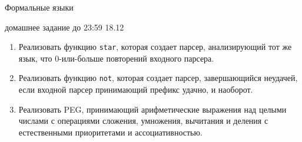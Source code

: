 \documentclass[12pt]{article}
\begin{document}
\begin{center} {\LARGE Формальные языки} \end{center}

\begin{center} \Large домашнее задание до 23:59 18.12 \end{center}
\bigskip

\begin{enumerate}
  \item Реализовать функцию \verb!star!, которая создает парсер, анализирующий тот же язык, что 0-или-больше повторений входного парсера.
  \item Реализовать функцию \verb!not!, которая создает парсер, завершающийся неудачей, если входной парсер принимающий префикс удачно, и наоборот. 
  \item Реализовать PEG, принимающий арифметические выражения над целыми числами с операциями сложения, умножения, вычитания и деления с естественными приоритетами и ассоциативностью. 
\end{enumerate}
\end{document}

